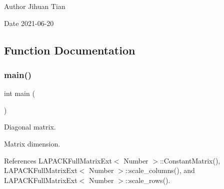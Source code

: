 \begin{DoxyAuthor}{Author}
Jihuan Tian 
\end{DoxyAuthor}
\begin{DoxyDate}{Date}
2021-\/06-\/20 
\end{DoxyDate}


\subsection{Function Documentation}
\mbox{\label{scale-rows-and-columns_8cc_ae66f6b31b5ad750f1fe042a706a4e3d4}} 
\subsubsection{\texorpdfstring{main()}{main()}}
{\footnotesize\ttfamily int main (\begin{DoxyParamCaption}{ }\end{DoxyParamCaption})}

Diagonal matrix.

Matrix dimension.

References L\+A\+P\+A\+C\+K\+Full\+Matrix\+Ext$<$ Number $>$\+::\+Constant\+Matrix(), L\+A\+P\+A\+C\+K\+Full\+Matrix\+Ext$<$ Number $>$\+::scale\+\_\+columns(), and L\+A\+P\+A\+C\+K\+Full\+Matrix\+Ext$<$ Number $>$\+::scale\+\_\+rows().


